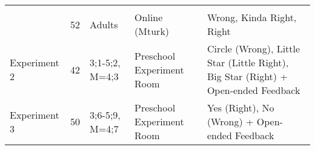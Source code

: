 \documentclass[
  english,
  ,man,floatsintext]{apa6}
\begin{document}
\begin{longtable}[]{@{}lllll@{}}
\begin{minipage}[t]{0.34\columnwidth}
\end{minipage}\tabularnewline
\begin{minipage}[t]{0.16\columnwidth}\raggedright
\strut
\end{minipage} & \begin{minipage}[t]{0.01\columnwidth}\raggedright
52\strut
\end{minipage} & \begin{minipage}[t]{0.17\columnwidth}\raggedright
Adults\strut
\end{minipage} & \begin{minipage}[t]{0.17\columnwidth}\raggedright
Online (Mturk)\strut
\end{minipage} & \begin{minipage}[t]{0.34\columnwidth}\raggedright
Wrong, Kinda Right, Right\strut
\end{minipage}\tabularnewline
\begin{minipage}[t]{0.16\columnwidth}\raggedright
Experiment 2\strut
\end{minipage} & \begin{minipage}[t]{0.01\columnwidth}\raggedright
42\strut
\end{minipage} & \begin{minipage}[t]{0.17\columnwidth}\raggedright
3;1-5;2, M=4;3\strut
\end{minipage} & \begin{minipage}[t]{0.17\columnwidth}\raggedright
Preschool Experiment Room\strut
\end{minipage} & \begin{minipage}[t]{0.34\columnwidth}\raggedright
Circle (Wrong), Little Star (Little Right), Big Star (Right) + Open-ended Feedback\strut
\end{minipage}\tabularnewline
\begin{minipage}[t]{0.16\columnwidth}\raggedright
Experiment 3\strut
\end{minipage} & \begin{minipage}[t]{0.01\columnwidth}\raggedright
50\strut
\end{minipage} & \begin{minipage}[t]{0.17\columnwidth}\raggedright
3;6-5;9, M=4;7\strut
\end{minipage} & \begin{minipage}[t]{0.17\columnwidth}\raggedright
Preschool Experiment Room\strut
\end{minipage} & \begin{minipage}[t]{0.34\columnwidth}\raggedright
Yes (Right), No (Wrong) + Open-ended Feedback\strut
\end{minipage}\tabularnewline
\bottomrule
\end{longtable}
\end{document}
